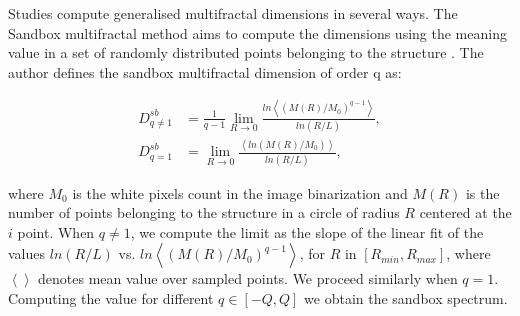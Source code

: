 \documentclass[final,5p,times]{elsarticle}
\begin{document}
{Studies compute generalised multifractal dimensions in several ways. The Sandbox multifractal method \cite{Tel1989} aims to compute the dimensions using the meaning value in a set of randomly distributed points belonging to the structure \cite{Debartolo2004}. The author defines the sandbox multifractal dimension of order q as:

 \begin{align}
D_{q\ne 1}^{sb} &= \frac{1}{q-1} \lim_{R \rightarrow 0}{
\frac{ln   { \left\langle  (M(R)/M_{0})^{q-1} \right\rangle   }}
{ln {(R/L)}       }},\\
D_{q=1}^{sb} &= \lim_{R \rightarrow 0}{
\frac{ \left\langle ln   { (M(R)/M_{0})  }  \right\rangle}
{ln {(R/L)}       }},
\end{align}

\noindent where $M_{0}$ is the white pixels count in the image binarization and  $M(R)$ is the number of points belonging to the structure in a circle of radius $R$ centered at the $i$ point. When $q\ne1$, we compute the limit as the slope of the linear fit of the values $ln(R/L)$ vs. $ ln  \left\langle  { (M(R)/M_{0})^{q-1}  }  \right\rangle$, for $R$ in $[R_{min}, R_{max}]$, where $ \left\langle   \right\rangle$ denotes mean value over sampled points. We proceed similarly when $q=1$. Computing the value for different $q \in [-Q,Q]$  we obtain the sandbox spectrum.


}
\end{document}
